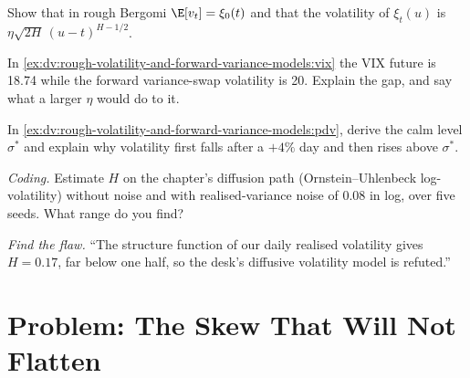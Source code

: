 \begin{exercise}[$\star\star$]\label{exo:dv:rough-volatility-and-forward-variance-models:4}
Show that in rough Bergomi $\E[v_t]=\xi_0(t)$ and that the volatility of $\xi_t(u)$ is
$\eta\sqrt{2H}\,(u-t)^{H-1/2}$.
\end{exercise}

\begin{exercise}[$\star\star$]\label{exo:dv:rough-volatility-and-forward-variance-models:5}
In \cref{ex:dv:rough-volatility-and-forward-variance-models:vix} the VIX future is 18.74 while the forward
variance-swap volatility is 20. Explain the gap, and say what a larger $\eta$ would do to it.
\end{exercise}

\begin{exercise}[$\star\star$]\label{exo:dv:rough-volatility-and-forward-variance-models:6}
In \cref{ex:dv:rough-volatility-and-forward-variance-models:pdv}, derive the calm level $\sigma^*$ and explain why
volatility first falls after a $+4\%$ day and then rises above $\sigma^*$.
\end{exercise}

\begin{exercise}[$\star\star\star$]\label{exo:dv:rough-volatility-and-forward-variance-models:7}
\emph{Coding.} Estimate $H$ on the chapter's diffusion path (Ornstein--Uhlenbeck log-volatility) without noise and
with realised-variance noise of 0.08 in log, over five seeds. What range do you find?
\end{exercise}

\begin{exercise}[$\star\star\star$]\label{exo:dv:rough-volatility-and-forward-variance-models:8}
\emph{Find the flaw.} ``The structure function of our daily realised volatility gives $H=0.17$, far below one half,
so the desk's diffusive volatility model is refuted.''
\end{exercise}

\section{Problem: The Skew That Will Not Flatten}

